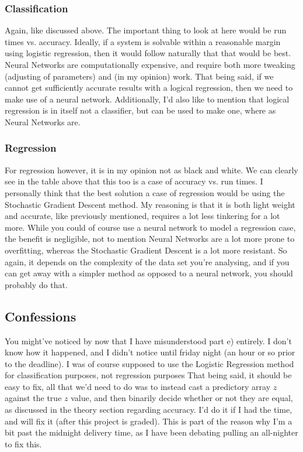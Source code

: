 \documentclass{article}
\begin{document}
\subsubsection*{Classification}
Again, like discussed above. The important thing to look at here would be run times vs. accuracy. Ideally, if a system is solvable within a reasonable margin using logistic regression, then it would follow naturally that that would be best. Neural Networks are computationally expensive, and require both more tweaking (adjusting of parameters) and (in my opinion) work. That being said, if we cannot get sufficiently accurate results with a logical regression, then we need to make use of a neural network.
\newline
Additionally, I'd also like to mention that logical regression is in itself not a classifier, but can be used to make one, where as Neural Networks are.
\subsubsection*{Regression}
For regression however, it is in my opinion not as black and white. We can clearly see in the table above that this too is a case of accuracy vs. run times. \newline
I personally think that the best solution a case of regression would be using the Stochastic Gradient Descent method. My reasoning is that it is both light weight and accurate, like previously mentioned, requires a lot less tinkering for a lot more. While you could of course use a neural network to model a regression case, the benefit is negligible, not to mention Neural Networks are a lot more prone to overfitting, whereas the Stochastic Gradient Descent is a lot more resistant.
\newline
So again, it depends on the complexity of the data set you're analysing, and if you can get away with a simpler method as opposed to a neural network, you should probably do that. \newpage
\subsection*{Confessions}
You might've noticed by now that I have misunderstood part e) entirely. I don't know how it happened, and I didn't notice until friday night (an hour or so prior to the deadline). I was of course supposed to use the Logistic Regression method for classification purposes, not regression purposes
\newline That being said, it should be easy to fix, all that we'd need to do was to instead cast a predictory array $z$ against the true $z$ value, and then binarily decide whether or not they are equal, as discussed in the theory section regarding accuracy. I'd do it if I had the time, and will fix it (after this project is graded). This is part of the reason why I'm a bit past the midnight delivery time, as I have been debating pulling an all-nighter to fix this.
\end{document}
